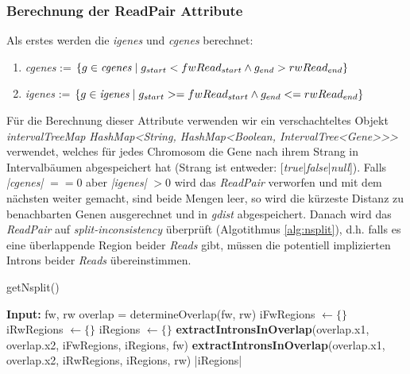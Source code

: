 \documentclass[12pt]{article}
\begin{document}
\subsubsection{Berechnung der ReadPair Attribute}
Als erstes werden die \textit{igenes} und \textit{cgenes} berechnet:
\begin{enumerate}
    \item \textit{cgenes} := $\left\{g \in \textit{cgenes} \hspace{1mm}|\hspace{1mm} g_{start } < fwRead_{start} \land g_{end} > rwRead_{end}\right\}$
    \item \textit{igenes} := $\left\{g \in \textit{igenes} \hspace{1mm}|\hspace{1mm} g_{start} >= fwRead_{start} \land g_{end} <= rwRead_{end}\right\}$
\end{enumerate}
Für die Berechnung dieser Attribute verwenden wir ein verschachteltes Objekt \textit{intervalTreeMap} \textit{HashMap<String, HashMap<Boolean, IntervalTree<Gene>\hspace{0.1mm}>\hspace{0.1mm}>}
verwendet, welches für jedes Chromosom die Gene nach ihrem Strang in Intervalbäumen abgespeichert hat (Strang ist entweder: [\textit{true}|\textit{false}|\textit{null}]).
Falls \textit{|cgenes|} $== 0$ aber \textit{|igenes|} $> 0$  wird das \textit{ReadPair} verworfen und 
mit dem nächsten weiter gemacht, sind beide Mengen leer, so wird die kürzeste Distanz zu benachbarten Genen ausgerechnet und in
\textit{gdist} abgespeichert.
Danach wird das \textit{ReadPair} auf \textit{split-inconsistency} überprüft (Algotithmus \ref{alg:nsplit}), d.h. falls es eine überlappende 
Region beider \textit{Reads} gibt, müssen die potentiell implizierten Introns beider \textit{Reads} übereinstimmen.
\begin{algorithm}[!htbp]
    \caption{getNsplit()}\label{alg:nsplit}
\begin{algorithmic}[1]
\State \textbf{Input:} fw, rw 
    \State {} 
\EndIf
\State overlap = determineOverlap(fw, rw) 
\State iFwRegions $\gets \{\}$ 
\State iRwRegions $\gets \{\}$ 
\State iRegions $\gets \{\}$ 
\State \textbf{extractIntronsInOverlap}(overlap.x1, overlap.x2, iFwRegions, iRegions, fw) 
\State \textbf{extractIntronsInOverlap}(overlap.x1, overlap.x2, iRwRegions, iRegions, rw)
\State {} 
\EndIf
{}
\State \Return |iRegions|
\EndIf
\State {}
\end{algorithmic}
\end{algorithm}
\end{document}
